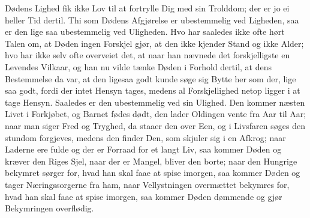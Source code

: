 \documentclass[12pt,a4paper]{article}
\begin{document}
Dødens Lighed fik ikke Lov til at fortrylle Dig med sin Trolddom; der er jo ei heller Tid dertil. Thi som Dødens Afgjørelse er ubestemmelig ved Ligheden, saa er den lige saa ubestemmelig ved Uligheden. Hvo har saaledes ikke ofte hørt Talen om, at Døden ingen Forskjel gjør, at den ikke kjender Stand og ikke Alder; hvo har ikke selv ofte overveiet det, at naar han nævnede det forskjelligste en Levendes Vilkaar, og han nu vilde tænke Døden i Forhold dertil, at dens Bestemmelse da var, at den ligesaa godt kunde søge sig Bytte her som der, lige saa godt, fordi der intet Hensyn tages, medens al Forskjellighed netop ligger i at tage Hensyn. Saaledes er den ubestemmelig ved sin Ulighed. Den kommer næsten Livet i Forkjøbet, og Barnet fødes dødt, den lader Oldingen vente fra Aar til Aar; naar man siger Fred og Tryghed, da staaer den over Een, og i Livsfaren søges den stundom forgjeves, medens den finder Den, som skjuler sig i en Afkrog; naar Laderne ere fulde og der er Forraad for et langt Liv, saa kommer Døden og kræver den Riges Sjel, naar der er Mangel, bliver den borte; naar den Hungrige bekymret sørger for, hvad han skal faae at spise imorgen, saa kommer Døden og tager Næringssorgerne fra ham, naar Vellystningen overmættet bekymres for, hvad han skal faae at spise imorgen, saa kommer Døden dømmende og gjør Bekymringen overflødig.
\end{document}
